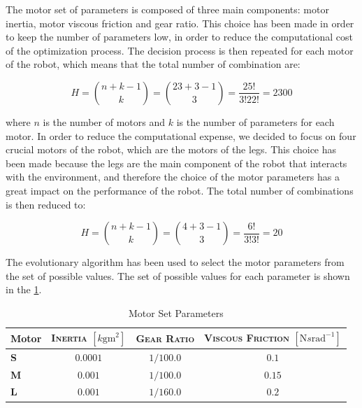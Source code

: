 The motor set of parameters is composed of three main components: motor inertia, motor viscous friction and gear ratio. This choice has been made in order to keep the number of parameters low, in order to reduce the computational cost of the optimization process. The decision process is then repeated for each motor of the robot, which means that the total number of combination are:

\begin{equation}
    H = \binom{n + k - 1}{k} = \binom{23 + 3 - 1}{3} = \frac{25!}{3! 22!} = 2300
\end{equation}

where $n$ is the number of motors and $k$ is the number of parameters for each motor. In order to reduce the computational expense, we decided to focus on four crucial motors of the robot, which are the motors of the legs. This choice has been made because the legs are the main component of the robot that interacts with the environment, and therefore the choice of the motor parameters has a great impact on the performance of the robot. The total number of combinations is then reduced to:

\begin{equation}
    H = \binom{n + k - 1}{k} = \binom{4 + 3 - 1}{3} = \frac{6!}{3! 3!} = 20
\end{equation}

The evolutionary algorithm has been used to select the motor parameters from the set of possible values. The set of possible values for each parameter is shown in the \cref{tab:motorparams}.

\begin{table}[h]
    \centering
    \begin{tabular}{l c c c}
        \toprule
        \textbf{Motor} & \textsc{Inertia} $[k\mathrm{gm}^2]$ & \textsc{Gear Ratio} & \textsc{Viscous Friction} $[\mathrm{N}s\mathrm{rad}^{-1}]$ \\
        \midrule
        \textbf{S}     & $0.0001$                            & $1/100.0$           & $0.1$                                                      \\
        \textbf{M}     & $0.001$                             & $1/100.0$           & $0.15$                                                     \\
        \textbf{L}     & $0.001$                             & $1/160.0$           & $0.2$                                                      \\
        \bottomrule
    \end{tabular}
    \caption{Motor Set Parameters}
    \label{tab:motorparams}
\end{table}


